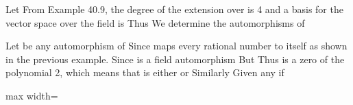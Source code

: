 \documentclass[11pt,oneside]{article}
\begin{document}
\begin{BookBody}
 Let  From Example 40.9, the degree of the extension  over  is 4 and a basis for the vector space  over the field  is  Thus   We determine the automorphisms of 

Let \BookInline{\phi } be any automorphism of  Since  maps every rational number to itself as shown in the previous example. Since \BookInline{\phi } is a field automorphism  But  Thus  is a zero of the polynomial  2, which means that  is either  or  Similarly Given any  if

\begin{center}\begin{adjustbox}{max width=\linewidth}\end{adjustbox}\end{center}

\end{BookBody}

\BookNarrativetrue
\end{document}

